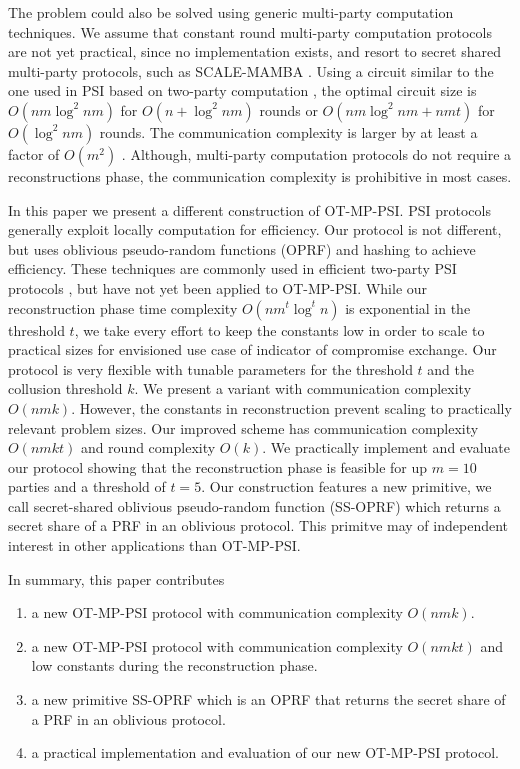 \documentclass[10pt, sigconf]{acmart}
\begin{document}
The problem could also be solved using generic multi-party computation techniques.
We assume that constant round multi-party computation protocols \cite{lindell2019efficient,lindell2016more} are not yet practical, since no implementation exists, and resort to secret shared multi-party protocols, such as SCALE-MAMBA \cite{aly2020scale}.
Using a circuit similar to the one used in PSI based on two-party computation \cite{huang12private}, the optimal circuit size is $O(nm \log^2 nm)$ for $O(n + \log^2 nm)$ rounds or $O(nm \log^2 nm + nmt)$ for $O(\log^2 nm)$ rounds.
The communication complexity is larger by at least a factor of $O(m^2)$ \cite{damgaard2019communication}.
Although, multi-party computation protocols do not require a reconstructions phase, the communication complexity is prohibitive in most cases.

In this paper we present a different construction of OT-MP-PSI.
PSI protocols generally exploit locally computation for efficiency.
Our protocol is not different, but uses oblivious pseudo-random functions (OPRF) and hashing to achieve efficiency.
These techniques are commonly used in efficient two-party PSI protocols \cite{Freedman2016,Kolesnikov,Pinkas}, but have not yet been applied to OT-MP-PSI.
While our reconstruction phase time complexity $O(n m^t \log^t n)$ is exponential in the threshold $t$, we take every effort to keep the constants low in order to scale to practical sizes for envisioned use case of indicator of compromise exchange.
Our protocol is very flexible with tunable parameters for the threshold $t$ and the collusion threshold $k$.
We present a variant with communication complexity $O(nmk)$.
However, the constants in reconstruction prevent scaling to practically relevant problem sizes.
Our improved scheme has communication complexity $O(nmkt)$ and round complexity $O(k)$.
We practically implement and evaluate our protocol showing that the reconstruction phase is feasible for up $m = 10$ parties and a threshold of $t = 5$.
Our construction features a new primitive, we call secret-shared oblivious pseudo-random function (SS-OPRF) which returns a secret share of a PRF in an oblivious protocol.
This primitve may of independent interest in other applications than OT-MP-PSI.

In summary, this paper contributes

\begin{enumerate}

\item a new OT-MP-PSI protocol with communication complexity $O(nmk)$.

\item a new OT-MP-PSI protocol with communication complexity $O(nmkt)$ and low constants during the reconstruction phase.

\item a new primitive SS-OPRF which is an OPRF that returns the secret share of a PRF in an oblivious protocol.

\item a practical implementation and evaluation of our new OT-MP-PSI protocol.

\end{enumerate}
\end{document}
